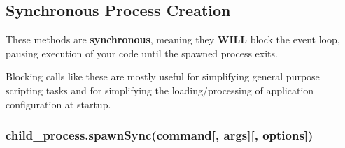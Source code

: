 \subsection{Synchronous Process
Creation}\label{synchronous-process-creation}

These methods are \textbf{synchronous}, meaning they \textbf{WILL} block
the event loop, pausing execution of your code until the spawned process
exits.

Blocking calls like these are mostly useful for simplifying general
purpose scripting tasks and for simplifying the loading/processing of
application configuration at startup.

\subsubsection{child\_process.spawnSync(command{[}, args{]}{[},
options{]})}\label{childux5fprocess.spawnsynccommand-args-options}

